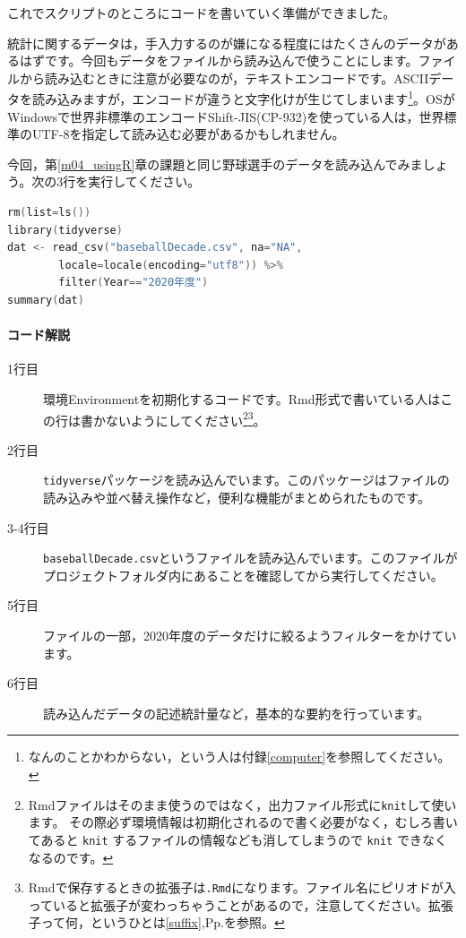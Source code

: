 \documentclass{ltjbook}
\begin{document}
これでスクリプトのところにコードを書いていく準備ができました。

統計に関するデータは，手入力するのが嫌になる程度にはたくさんのデータがあるはずです。今回もデータをファイルから読み込んで使うことにします。ファイルから読み込むときに注意が必要なのが，テキストエンコードです。ASCIIデータを読み込みますが，エンコードが違うと文字化けが生じてしまいます\footnote{なんのことかわからない，という人は付録\ref{computer}を参照してください。}。OSがWindowsで世界非標準のエンコードShift-JIS(CP-932)を使っている人は，世界標準のUTF-8を指定して読み込む必要があるかもしれません。

今回，第\ref{m04_usingR}章の課題と同じ野球選手のデータを読み込んでみましょう。次の3行を実行してください。

\begin{lstlisting}[language=c++,label={code:11_01},caption={環境の初期化とパッケージ，ファイルの読み込み}]
rm(list=ls())
library(tidyverse)
dat <- read_csv("baseballDecade.csv", na="NA", 
        locale=locale(encoding="utf8")) %>% 
        filter(Year=="2020年度")
summary(dat)
\end{lstlisting}

\paragraph{コード解説}
\begin{description}
	\item[1行目] 環境Environmentを初期化するコードです。Rmd形式で書いている人はこの行は書かないようにしてください\footnote{Rmdファイルはそのまま使うのではなく，出力ファイル形式に\verb|knit|して使います。 その際必ず環境情報は初期化されるので書く必要がなく，むしろ書いてあると \verb|knit| するファイルの情報なども消してしまうので \verb|knit| できなくなるのです。}\footnote{Rmdで保存するときの拡張子は\verb|.Rmd|になります。ファイル名にピリオドが入っていると拡張子が変わっちゃうことがあるので，注意してください。拡張子って何，というひとは\ref{suffix},Pp.\pageref{suffix}を参照。}。
	\item[2行目] \texttt{tidyverse}パッケージを読み込んでいます。このパッケージはファイルの読み込みや並べ替え操作など，便利な機能がまとめられたものです。
	\item[3-4行目] \texttt{baseballDecade.csv}というファイルを読み込んでいます。このファイルがプロジェクトフォルダ内にあることを確認してから実行してください。
	\item[5行目] ファイルの一部，2020年度のデータだけに絞るようフィルターをかけています。
	\item[6行目] 読み込んだデータの記述統計量など，基本的な要約を行っています。
\end{description}
\end{document}
